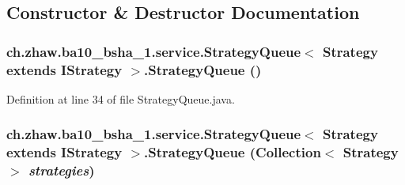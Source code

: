 \subsection{Constructor \& Destructor Documentation}
\hypertarget{classch_1_1zhaw_1_1ba10__bsha__1_1_1service_1_1StrategyQueue_3_01Strategy_01extends_01IStrategy_01_4_a93e359e9f2f3e6599556932ebdc2afd9}{
\subsubsection[{StrategyQueue}]{\setlength{\rightskip}{0pt plus 5cm}ch.zhaw.ba10\_\-bsha\_\-1.service.StrategyQueue$<$ Strategy extends {\bf IStrategy} $>$.StrategyQueue ()}}
\label{classch_1_1zhaw_1_1ba10__bsha__1_1_1service_1_1StrategyQueue_3_01Strategy_01extends_01IStrategy_01_4_a93e359e9f2f3e6599556932ebdc2afd9}


Definition at line 34 of file StrategyQueue.java.\hypertarget{classch_1_1zhaw_1_1ba10__bsha__1_1_1service_1_1StrategyQueue_3_01Strategy_01extends_01IStrategy_01_4_a4c8a5b4f7ced4d925516119b8c74cb31}{
\subsubsection[{StrategyQueue}]{\setlength{\rightskip}{0pt plus 5cm}ch.zhaw.ba10\_\-bsha\_\-1.service.StrategyQueue$<$ Strategy extends {\bf IStrategy} $>$.StrategyQueue (Collection$<$ Strategy $>$ {\em strategies})}}
\label{classch_1_1zhaw_1_1ba10__bsha__1_1_1service_1_1StrategyQueue_3_01Strategy_01extends_01IStrategy_01_4_a4c8a5b4f7ced4d925516119b8c74cb31}


